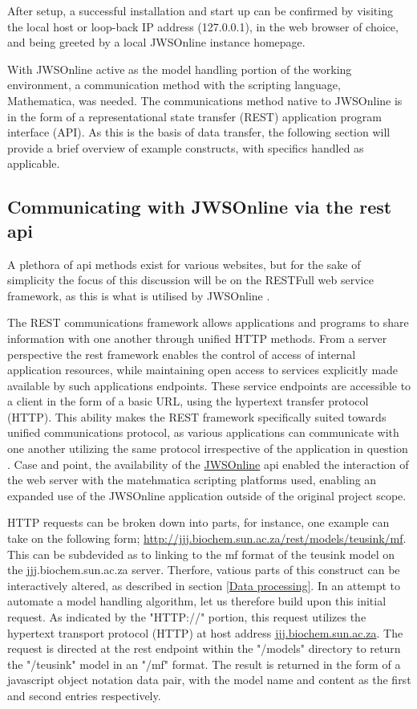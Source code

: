 After setup, a successful installation and start up can be confirmed by visiting the local host or loop-back IP address (127.0.0.1), in the web browser of choice, and being greeted by a local JWSOnline instance homepage.

With JWSOnline active as the model handling portion of the working environment, a communication method with the scripting language, Mathematica, was needed. The communications method native to JWSOnline is in the form of a representational state transfer (REST) application program interface (API). As this is the basis of data transfer, the following section will provide a brief overview of example constructs, with specifics handled as applicable. 

\subsection{Communicating with JWSOnline via the \gls{rest} \gls{api}} \label{REST Communication}
A plethora of \gls{api} methods exist for various websites, but for the sake of simplicity the focus of this discussion will be on the RESTFull web service framework, as this is what is utilised by JWSOnline \cite{rest2018}.

The REST communications framework allows applications and programs to share information with one another through unified HTTP methods. From a server perspective the \gls{rest} framework enables the control of access of internal application resources, while maintaining open access to services explicitly made available by such applications endpoints. These service endpoints are accessible to a client in the form of a basic URL, using the hypertext transfer protocol (HTTP). This ability makes the REST framework specifically suited towards unified communications protocol, as various applications can communicate with one another utilizing the same protocol irrespective of the application in question \cite{rest2018}. Case and point, the availability of the \href{http://jjj.biochem.sun.ac.za}{JWSOnline} \gls{api} enabled the interaction of the web server with the matehmatica scripting platforms used, enabling an expanded use of the JWSOnline application outside of the original project scope. 

HTTP requests can be broken down into parts, for instance, one example can take on the following form; \href{http://jjj.biochem.sun.ac.za/rest/models/teusink/mf}{http://jjj.biochem.sun.ac.za/rest/models/teusink/mf}. This can be subdevided as to linking to the mf format of the teusink model on the jjj.biochem.sun.ac.za server. Therfore, vatious parts of this construct can be interactively altered, as described in section \ref{Data processing}. In an attempt to automate a model handling algorithm, let us therefore build upon this initial request. As indicated by the "HTTP://" portion, this request utilizes the hypertext transport protocol (HTTP) at host address \href{jjj.biochem.sun.ac.za}{jjj.biochem.sun.ac.za}. The request is directed at the \gls{rest} endpoint within the "/models" directory to return the "/teusink" model in an "/mf" format. The result is returned in the form of a javascript object notation data pair, with the model name and content as the first and second entries respectively.

